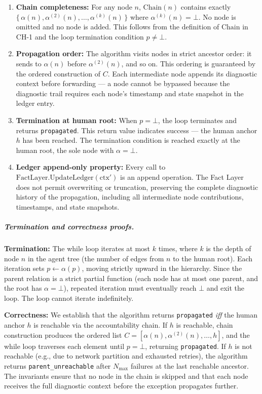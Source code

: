 \begin{enumerate}
\item[$\mathbf{I_1}$] \textbf{Chain completeness:} For any node $n$, $\text{Chain}(n)$ contains exactly $\{\,\alpha(n), \alpha^{(2)}(n), \dots, \alpha^{(k)}(n)\,\}$ where $\alpha^{(k)}(n) = \bot$. No node is omitted and no node is added. This follows from the definition of $\text{Chain}$ in CH-1 and the loop termination condition $p \neq \bot$.

\item[$\mathbf{I_2}$] \textbf{Propagation order:} The algorithm visits nodes in strict ancestor order: it sends to $\alpha(n)$ before $\alpha^{(2)}(n)$, and so on. This ordering is guaranteed by the ordered construction of $C$. Each intermediate node appends its diagnostic context before forwarding — a node cannot be bypassed because the diagnostic trail requires each node's timestamp and state snapshot in the ledger entry.

\item[$\mathbf{I_3}$] \textbf{Termination at human root:} When $p = \bot$, the loop terminates and returns \texttt{propagated}. This return value indicates success — the human anchor $h$ has been reached. The termination condition is reached exactly at the human root, the sole node with $\alpha = \bot$.

\item[$\mathbf{I_4}$] \textbf{Ledger append-only property:} Every call to $\text{FactLayer.UpdateLedger}(\text{ctx}')$ is an append operation. The Fact Layer does not permit overwriting or truncation, preserving the complete diagnostic history of the propagation, including all intermediate node contributions, timestamps, and state snapshots.
\end{enumerate}

\subparagraph{Termination and correctness proofs.}

\textbf{Termination:} The while loop iterates at most $k$ times, where $k$ is the depth of node $n$ in the agent tree (the number of edges from $n$ to the human root). Each iteration sets $p \leftarrow \alpha(p)$, moving strictly upward in the hierarchy. Since the parent relation is a strict partial function (each node has at most one parent, and the root has $\alpha = \bot$), repeated iteration must eventually reach $\bot$ and exit the loop. The loop cannot iterate indefinitely.

\textbf{Correctness:} We establish that the algorithm returns \texttt{propagated} \emph{iff} the human anchor $h$ is reachable via the accountability chain. If $h$ is reachable, chain construction produces the ordered list $C = [\alpha(n), \alpha^{(2)}(n), \dots, h]$, and the while loop traverses each element until $p = \bot$, returning \texttt{propagated}. If $h$ is not reachable (e.g., due to network partition and exhausted retries), the algorithm returns \texttt{parent\_unreachable} after $N_{\max}$ failures at the last reachable ancestor. The invariants ensure that no node in the chain is skipped and that each node receives the full diagnostic context before the exception propagates further.

